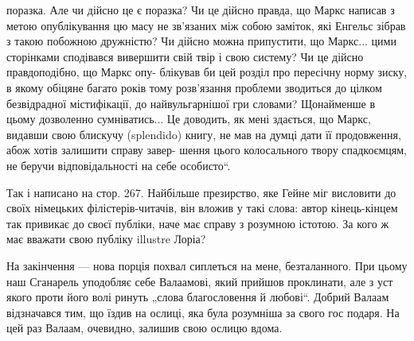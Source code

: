 поразка. Але чи дійсно це є поразка? Чи це дійсно правда, що Маркс написав з метою опублікування цю масу не зв’язаних між
собою заміток, які Енгельс зібрав з такою побожною дружністю? Чи дійсно можна припустити, що Маркс... цими сторінками
сподівався вивершити свій твір і свою систему? Чи це дійсно правдоподібно, що Маркс опу- блікував би цей розділ про
пересічну норму зиску, в якому обіцяне багато років тому розв’язання проблеми зводиться до цілком безвідрадної містифікації, до найвульгарнішої гри словами? Щонайменше в цьому дозволенно сумніватись... Це доводить, як мені здається, що Маркс,
видавши свою блискучу (splendido) книгу, не мав на думці дати її продовження, абож хотів залишити справу завер- шення цього
колосального твору спадкоємцям, не беручи відповідальності на себе особисто“.

Так і написано на стор. 267. Найбільше презирство, яке Гейне міг висловити до своїх німецьких філістерів-читачів, він вложив
у такі слова: автор кінець-кінцем так привикає до своєї публіки, наче має справу з розумною істотою. За кого ж має вважати
свою публіку illustre Лоріа?

На закінчення — нова порція похвал сиплеться на мене, безталанного. При цьому наш Сганарель уподобляє себе Валаамові, який
прийшов проклинати, але з уст якого проти його волі ринуть „слова благословення й любові“. Добрий Валаам відзначався тим, що
їздив на ослиці, яка була розумніша за свого гос подаря. На цей раз Валаам, очевидно, залишив свою ослицю вдома.
\parbreak{}  %
